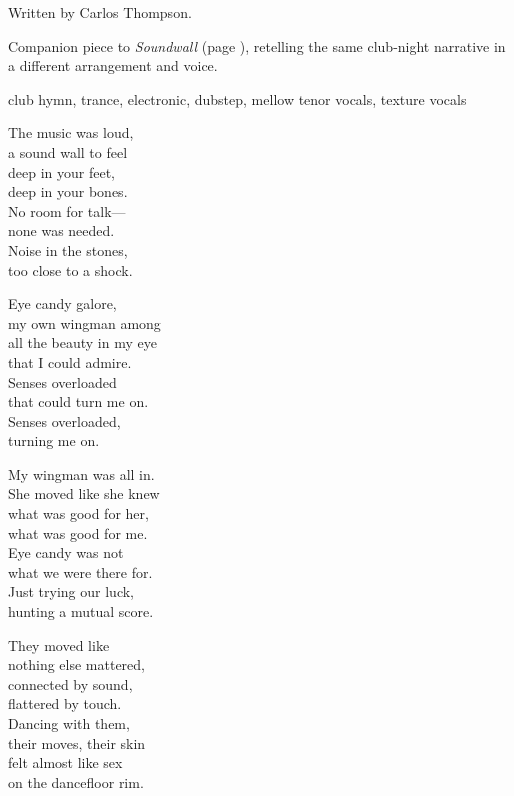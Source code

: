 
\label{sec:wingman}
\begin{notes}
Written by Carlos Thompson.

Companion piece to \emph{Soundwall} (page \pageref{sec:soundwall}), retelling the same club-night narrative in a different arrangement and voice.
\end{notes}
\begin{style}
club hymn, trance, electronic, dubstep, mellow tenor  vocals, texture vocals
\end{style}
\begin{lyrics}
The music was loud,\\
a sound wall to feel\\
deep in your feet,\\
deep in your bones.\\
No room for talk—\\
none was needed.\\
Noise in the stones,\\
too close to a shock.

Eye candy galore,\\
my own wingman among\\
all the beauty in my eye\\
that I could admire.\\
Senses overloaded\\
that could turn me on.\\
Senses overloaded,\\
turning me on.

My wingman was all in.\\
She moved like she knew\\
what was good for her,\\
what was good for me.\\
Eye candy was not\\
what we were there for.\\
Just trying our luck,\\
hunting a mutual score.

They moved like\\
nothing else mattered,\\
connected by sound,\\
flattered by touch.\\
Dancing with them,\\
their moves, their skin\\
felt almost like sex\\
on the dancefloor rim.


\end{lyrics}
